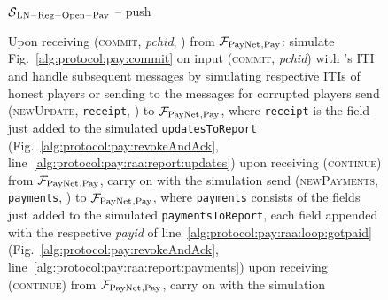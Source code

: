 \begin{figure}[!htbp]
\begin{simulatorbox}{$\mathcal{S}{}_{\mathrm{LN - Reg - Open - Pay}}$ -- push}
\begin{algorithmic}[1]
      \State Upon receiving (\textsc{commit}, \textit{pchid}, \alice) from
      $\mathcal{F}_{\mathrm{PayNet}}{}_{\mathrm{, Pay}}$:
      \Indent
        \State simulate Fig.~\ref{alg:protocol:pay:commit} on input
        (\textsc{commit}, \textit{pchid}) with \alice's ITI and handle
        subsequent messages by simulating respective ITIs of honest players or
        sending to \adversary{} the messages for corrupted players
        \label{alg:sim:push:commit}
          \State send (\textsc{newUpdate}, \texttt{receipt}, \alice) to
          $\mathcal{F}_{\mathrm{PayNet}}{}_{\mathrm{, Pay}}$, where \texttt{receipt} is the
          field just added to the simulated \texttt{updatesToReport}
          (Fig.~\ref{alg:protocol:pay:revokeAndAck},
          line~\ref{alg:protocol:pay:raa:report:updates})
          \label{alg:sim:push:report:updates}
          \State upon receiving (\textsc{continue}) from
          $\mathcal{F}_{\mathrm{PayNet}}{}_{\mathrm{, Pay}}$, carry on with the simulation
        \EndIf
        \label{alg:sim:push:report:payments:if}
          \State send (\textsc{newPayments}, \texttt{payments}, \alice) to
          $\mathcal{F}_{\mathrm{PayNet}}{}_{\mathrm{, Pay}}$, where \texttt{payments} consists of the
          fields just added to the simulated \texttt{paymentsToReport}, each
          field appended with the respective \textit{payid} of
          line~\ref{alg:protocol:pay:raa:loop:gotpaid}
          (Fig.~\ref{alg:protocol:pay:revokeAndAck},
          line~\ref{alg:protocol:pay:raa:report:payments})
          \label{alg:sim:push:report:payments}
          \State upon receiving (\textsc{continue}) from $\mathcal{F}_{\mathrm{PayNet}}{}_{\mathrm{,
          Pay}}$, carry on with the simulation
        \EndIf
      \EndIndent
    \end{algorithmic}
  \end{simulatorbox}
  \caption{}
  \label{alg:sim:push}
\end{figure}

